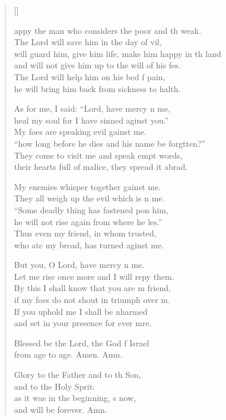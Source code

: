 \settowidth{\versewidth}{will guard him, give him life, make him happy in the land *}
\begin{verse}[\versewidth]
  \begin{patverse}
appy the man who considers the poor and th weak.\Med\\
The Lord will save him in the day of vil,\\
will guard him, give him life, make him happy in th land\Med\\
and will not give him up to the will of his fes.\\
The Lord will help him on his bed f pain,\Med\\
he will bring him back from sickness to halth.

As for me, I said: “Lord, have mercy n me,\Med\\
heal my soul for I have sinned aginst you.”\\
My foes are speaking evil gainst me.\Med\\
“how long before he dies and his name be forgtten?”\Med\\
They come to visit me and speak empt words,\\
their hearts full of malice, they spread it abrad.

My enemies whisper together gainst me.\Med\\
They all weigh up the evil which is n me.\\
“Some deadly thing has fastened pon him,\Med\\
he will not rise again from where he l\pointup{\i}es.”\\
Thus even my friend, in whom  trusted,\Med\\
who ate my bread, has turned aginst me.

But you, O Lord, have mercy n me.\Med\\
Let me rise once more and I will repy them.\\
By this I shall know that you are m friend,\Med\\
if my foes do not shout in triumph over m.\\
If you uphold me I shall be nharmed\Med\\
and set in your presence for ever mre.

Blessed be the Lord, the God f Israel\Med\\
from age to age. Amen. Amn.

Glory to the Father and to th Son,\Med\\
and to the Holy Sp\pointup{\i}rit:\\
as it was in the beginning, \pointup{\i}s now,\Med\\
and will be forever. Amn. 
  \end{patverse}
\end{verse}
